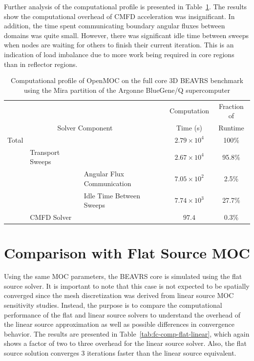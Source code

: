 Further analysis of the computational profile is presented in Table~\ref{tab:full-core-comp-prof}. The results show the computational overhead of CMFD acceleration was insignificant. In addition, the time spent communicating boundary angular fluxes between domains was quite small. However, there was significant idle time between sweeps when nodes are waiting for others to finish their current iteration. This is an indication of load imbalance due to more work being required in core regions than in reflector regions.

\begin{table}[ht]
	\centering
	\caption{Computational profile of OpenMOC on the full core 3D BEAVRS benchmark using the Mira partition of the Argonne BlueGene/Q supercomputer}
	\medskip
	\begin{tabular}{lll|c|c}
		\hline
		& & & Computation & Fraction of \\
		\multicolumn{3}{c|}{Solver Component} & Time (s) & Runtime\\
		\hline
		Total & & & $2.79 \times 10^4$ & 100\% \\
		& Transport Sweeps & & $2.67 \times 10^4$ & 95.8\% \\
		& & Angular Flux Communication & $7.05 \times 10^2$ & 2.5\% \\
		& & Idle Time Between Sweeps & $7.74 \times 10^3$ & 27.7\% \\
		& CMFD Solver & & $97.4$ & 0.3\% \\		
		\hline
	\end{tabular}
	\label{tab:full-core-comp-prof}
\end{table}

\newpage

\section{Comparison with Flat Source MOC}
\label{sec:fc-flat-source}

Using the same \ac{MOC} parameters, the BEAVRS core is simulated using the flat source solver. It is important to note that this case is not expected to be spatially converged since the mesh discretization was derived from linear source \ac{MOC} sensitivity studies. Instead, the purpose is to compare the computational performance of the flat and linear source solvers to understand the overhead of the linear source approximation as well as possible differences in convergence behavior. The results are presented in Table~\ref{tab:fc-comp-flat-linear}, which again shows a factor of two to three overhead for the linear source solver. Also, the flat source solution converges 3 iterations faster than the linear source equivalent. 


